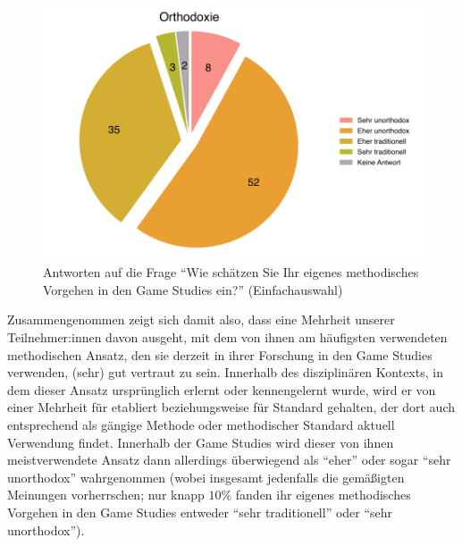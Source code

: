 \documentclass{scrartcl}
\begin{document}
\begin{figure}[ht]
   \includegraphics[width=1\textwidth]{orthodoxie.pdf}
   \caption{Antworten auf die Frage \enquote{Wie schätzen Sie Ihr eigenes methodisches Vorgehen in den Game Studies ein?} (Einfachauswahl)}
   \label{fig:orthodoxie}
\end{figure}

Zusammengenommen zeigt sich damit also, dass eine Mehrheit unserer Teilnehmer:innen davon ausgeht, mit dem von ihnen am häufigsten verwendeten methodischen Ansatz, den sie derzeit in ihrer Forschung in den Game Studies verwenden, (sehr) gut vertraut zu sein.
Innerhalb des disziplinären Kontexts, in dem dieser Ansatz ursprünglich erlernt oder kennengelernt wurde, wird er von einer Mehrheit für etabliert beziehungsweise für Standard gehalten, der dort auch entsprechend als gängige Methode oder methodischer Standard aktuell Verwendung findet.
Innerhalb der Game Studies wird dieser von ihnen meistverwendete Ansatz dann allerdings überwiegend als \enquote{eher} oder sogar \enquote{sehr unorthodox} wahrgenommen (wobei insgesamt jedenfalls die gemäßigten Meinungen vorherrschen; nur knapp $10\%$ fanden ihr eigenes methodisches Vorgehen in den Game Studies entweder \enquote{sehr traditionell} oder \enquote{sehr unorthodox}).


\end{document}
